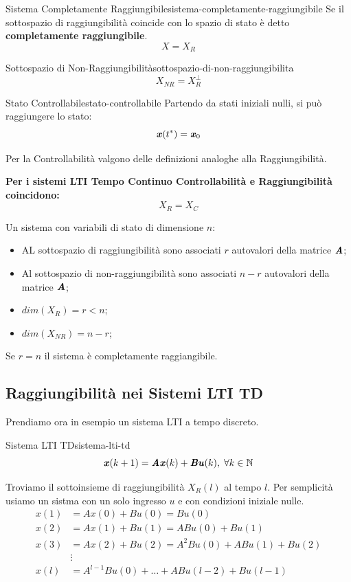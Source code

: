 \documentclass[12pt]{article}
\begin{document}
\begin{definition}{Sistema Completamente Raggiungibile}{sistema-completamente-raggiungibile}
    Se il sottospazio di raggiungibilit\`a coincide con lo spazio di stato \`e detto \textbf{completamente raggiungibile}.
    \[ X = X_R \]
\end{definition}

\begin{definition}{Sottospazio di Non-Raggiungibilit\`a}{sottospazio-di-non-raggiungibilita}
    \[ X _{NR} = X_R^{\perp} \]
\end{definition}

\begin{definition}{Stato Controllabile}{stato-controllabile}
    Partendo da stati iniziali nulli, si pu\`o raggiungere lo stato:
    \[ \textbf{\textit{x}}(t^{*}) = \textbf{\textit{x}}_0 \]
\end{definition}

Per la Controllabilit\`a valgono delle definizioni analoghe alla Raggiungibilit\`a.

\textbf{Per i sistemi LTI Tempo Continuo Controllabilit\`a e Raggiungibilit\`a coincidono:}
\[ \boxed{ X_R = X_C } \]

Un sistema con variabili di stato di dimensione $n$:
\begin{itemize}
    \item AL sottospazio di raggiungibilit\`a sono associati $r$ autovalori della matrice $\textbf{\textit{A}}$;
    \item Al sottospazio di non-raggiungibilit\`a sono associati $n-r$ autovalori della matrice $\textbf{\textit{A}}$;
    \item $dim(X_R) = r < n$;
    \item $dim(X _{NR}) = n-r$;
\end{itemize}

Se $r = n$ il sistema \`e completamente raggiangibile.


\subsection{Raggiungibilit\`a nei Sistemi LTI TD}
Prendiamo ora in esempio un sistema LTI a tempo discreto.
\begin{definition}{Sistema LTI TD}{sistema-lti-td}
    \[ \textbf{\textit{x}}(k+1) = \textbf{\textit{Ax}}(k) + \textbf{\textit{Bu}}(k), \;\forall k \in \mathbb{N} \]
\end{definition}

Troviamo il sottoinsieme di raggiungibilit\`a $X_R(l)$ al tempo $l$. Per semplicit\`a usiamo un sistma con un solo ingresso $u$ e con condizioni iniziale nulle.
\begin{align*}
    x(1) & = Ax(0) + Bu(0) = Bu(0) \\
    x(2) & = Ax(1) + Bu(1) = ABu(0) + Bu(1) \\
    x(3) & = Ax(2) + Bu(2) = A^{2}Bu(0) + ABu(1) + Bu(2) \\ 
         & \vdots \\
    x(l) & = A^{l-1}Bu(0) + \dots + ABu(l-2) + Bu(l-1)
\end{align*}
\end{document}

